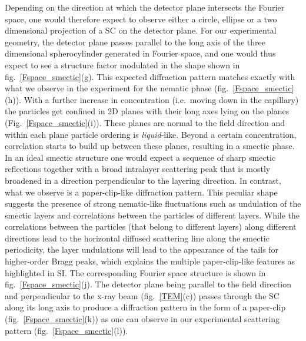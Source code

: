 \documentclass[aps,prl,preprint,superscriptaddress]{revtex4-1} %
\begin{document}
Depending on the direction at which the detector plane intersects the Fourier space, one would therefore expect to observe either a circle, ellipse or a two dimensional projection of a SC on the detector plane. For our experimental geometry, the detector plane passes parallel to the long axis of the three dimensional spherocylinder generated in Fourier space, and one would thus expect to see a structure factor modulated in the shape shown in fig.~\ref{Fspace_smectic}(g). This expected diffraction pattern matches exactly with what we observe in the experiment for the nematic phase (fig.~\ref{Fspace_smectic}(h)). With a further increase in concentration (i.e.~moving down in the capillary) the particles get confined in 2D planes with their long axes lying on the planes (Fig.~\ref{Fspace_smectic}(i)). These planes are normal to the field direction and within each plane particle ordering is \emph{liquid}-like. Beyond a certain concentration, correlation starts to build up between these planes, resulting in a smectic phase. In an ideal smectic structure one would expect a sequence of sharp smectic reflections together with a broad intralayer scattering peak that is mostly broadened in a direction perpendicular to the layering direction. In contrast, what we observe is a paper-clip-like diffraction pattern. This peculiar shape suggests the presence of strong nematic-like fluctuations such as undulation of the smectic layers and correlations between the particles of different layers. While the correlations between the particles (that belong to different layers) along different directions lead to the horizontal diffused scattering line along the smectic periodicity, the layer undulations will lead to the appearance of the tails for higher-order Bragg peaks, which explains the multiple paper-clip-like features as highlighted in SI\@. The corresponding Fourier space structure is shown in fig.~\ref{Fspace_smectic}(j). The detector plane being parallel to the field direction and perpendicular to the x-ray beam (fig.~\ref{TEM}(c)) passes through the SC along its long axis to produce a diffraction pattern in the form of a paper-clip (fig.~\ref{Fspace_smectic}(k)) as one can observe in our experimental scattering pattern (fig.~\ref{Fspace_smectic}(l)).\par
\end{document}
